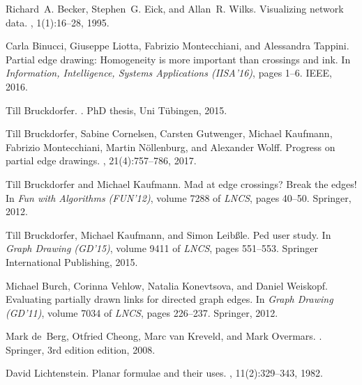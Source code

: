 \documentclass[a4paper,english,numberwithinsect]{eurocg18}
\begin{document}
%
\begin{thebibliography}{1}
	
	Richard~A. Becker, Stephen~G. Eick, and Allan~R. Wilks.
	\newblock Visualizing network data.
	, 1(1):16--28,
	1995.
	
	Carla Binucci, Giuseppe Liotta, Fabrizio Montecchiani, and Alessandra Tappini.
	\newblock Partial edge drawing: Homogeneity is more important than crossings
	and ink.
	\newblock In {\em Information, Intelligence, Systems Applications (IISA'16)},
	pages 1--6. IEEE, 2016.
	
	Till Bruckdorfer.
	.
	\newblock PhD thesis, Uni Tübingen, 2015.
	
	Till Bruckdorfer, Sabine Cornelsen, Carsten Gutwenger, Michael Kaufmann,
	Fabrizio Montecchiani, Martin Nöllenburg, and Alexander Wolff.
	\newblock Progress on partial edge drawings.
	, 21(4):757--786, 2017.
	
	Till Bruckdorfer and Michael Kaufmann.
	\newblock Mad at edge crossings? {Break} the edges!
	\newblock In {\em Fun with Algorithms (FUN'12)}, volume 7288 of {\em LNCS},
	pages 40--50. Springer, 2012.
	
	Till Bruckdorfer, Michael Kaufmann, and Simon Leibßle.
	\newblock Ped user study.
	\newblock In {\em Graph Drawing (GD'15)}, volume 9411 of {\em LNCS}, pages
	551--553. Springer International Publishing, 2015.
	
	Michael Burch, Corinna Vehlow, Natalia Konevtsova, and Daniel Weiskopf.
	\newblock Evaluating partially drawn links for directed graph edges.
	\newblock In {\em Graph Drawing (GD'11)}, volume 7034 of {\em LNCS}, pages
	226--237. Springer, 2012.
	
	Mark de~Berg, Otfried Cheong, Marc van Kreveld, and Mark Overmars.
	.
	\newblock Springer, 3rd edition edition, 2008.
	
	David Lichtenstein.
	\newblock Planar formulae and their uses.
	, 11(2):329--343, 1982.	
\end{thebibliography}
\end{document}
